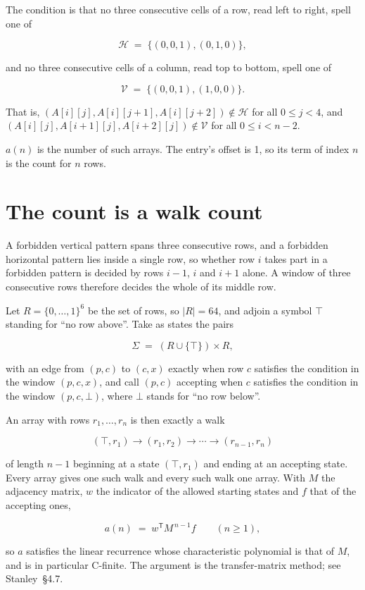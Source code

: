 \documentclass[11pt]{article}
\theoremstyle{definition}
\begin{document}
The condition is that no three consecutive cells of a row, read left to right, spell one of

\[\mathcal{H} \;=\; \{(0,0,1), (0,1,0)\},\]

and no three consecutive cells of a column, read top to bottom, spell one of

\[\mathcal{V} \;=\; \{(0,0,1), (1,0,0)\}.\]

That is, $(A[i][j],A[i][j{+}1],A[i][j{+}2]) \notin \mathcal{H}$ for all $0 \le j < 4$, and $(A[i][j],A[i{+}1][j],A[i{+}2][j]) \notin \mathcal{V}$ for all $0 \le i < n-2$.

$a(n)$ is the number of such arrays. The entry's offset is 1, so its term of index $n$ is the count for $n$ rows.

\section{The count is a walk count}

A forbidden vertical pattern spans three consecutive rows, and a forbidden horizontal pattern lies inside a single row, so whether row $i$ takes part in a forbidden pattern is decided by rows $i-1$, $i$ and $i+1$ alone. A window of three consecutive rows therefore decides the whole of its middle row.

Let $R = \{0,\dots,1\}^{6}$ be the set of rows, so $|R| = 64$, and adjoin a symbol $\top$ standing for ``no row above''. Take as states the pairs

\[\Sigma \;=\; (R \cup \{\top\}) \times R,\]

with an edge from $(p,c)$ to $(c,x)$ exactly when row $c$ satisfies the condition in the window $(p,c,x)$, and call $(p,c)$ accepting when $c$ satisfies the condition in the window $(p,c,\bot)$, where $\bot$ stands for ``no row below''.

An array with rows $r_1,\dots,r_n$ is then exactly a walk

\[(\top,r_1) \to (r_1,r_2) \to \cdots \to (r_{n-1},r_n)\]

of length $n-1$ beginning at a state $(\top,r_1)$ and ending at an accepting state. Every array gives one such walk and every such walk one array. With $M$ the adjacency matrix, $w$ the indicator of the allowed starting states and $f$ that of the accepting ones,

\[a(n) \;=\; w^{\mathsf T} M^{\,n-1} f \qquad (n \ge 1),\]

so $a$ satisfies the linear recurrence whose characteristic polynomial is that of $M$, and is in particular C-finite. The argument is the transfer-matrix method; see Stanley~\S4.7.
\end{document}
